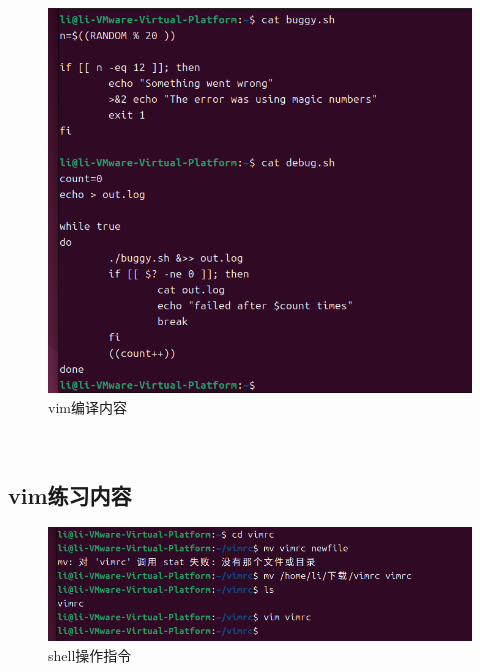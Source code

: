 \documentclass[a4paper, 12pt]{article}
\begin{document}
\begin{figure}[H]
  \centering
  \includegraphics[width=1\textwidth]{屏幕截图 2024-09-05 143854.png}
  \caption{vim编译内容 }
    \end{figure}


\\
\newpage
     \subsection{\color{red}vim练习内容}
\vspace{-10pt}
\begin{figure}[H]
  \centering
  \includegraphics[width=1\textwidth]{屏幕截图 2024-09-05 165256.png}
  \caption{shell操作指令}
    \end{figure}
\end{document}
